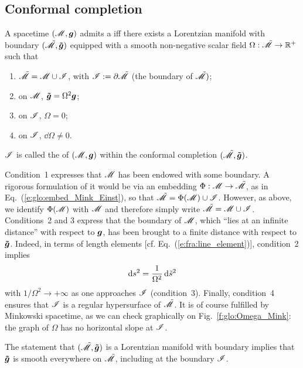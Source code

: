 \subsection{Conformal completion} \label{s:glo:def_conf_compl}

\begin{greybox}
A spacetime $(\mathscr{M},\bm{g})$ admits a
iff there exists a Lorentzian manifold with boundary
$(\tilde{\mathscr{M}},\bm{\tilde{g}})$ equipped with a smooth non-negative scalar field
$\Omega: \tilde{\mathscr{M}} \rightarrow \mathbb{R}^+$
such that
\begin{enumerate}
\item $\tilde{\mathscr{M}} = \mathscr{M} \cup \mathscr{I}$, with $\mathscr{I} := \partial \tilde{\mathscr{M}}$
(the boundary of $\tilde{\mathscr{M}})$;
\item on $\mathscr{M}$, $\bm{\tilde{g}} = \Omega^2 \bm{g}$;
\item on $\mathscr{I}$, $\Omega=0$;
\item on $\mathscr{I}$, $\dd \Omega \not= 0$.
\end{enumerate}
$\mathscr{I}$ is called the 
of $(\mathscr{M},\bm{g})$ within
the conformal completion $(\tilde{\mathscr{M}},\bm{\tilde{g}})$.
\end{greybox}
Condition~1 expresses that $\mathscr{M}$ has been endowed with some boundary.
A rigorous formulation of it would be via an embedding $\Phi:\mathscr{M} \rightarrow \tilde{\mathscr{M}}$,
as in Eq.~(\ref{e:glo:embed_Mink_Einst}), so that
$\tilde{\mathscr{M}} = \Phi(\mathscr{M}) \cup \mathscr{I}$. However, as above, we identify $\Phi(\mathscr{M})$
with $\mathscr{M}$ and therefore simply write $\tilde{\mathscr{M}} = \mathscr{M} \cup \mathscr{I}$.
Conditions~2 and 3 express that the boundary of $\mathscr{M}$, which ``lies at an infinite
distance'' with respect to $\bm{g}$, has been brought to a
finite distance with respect to $\bm{\tilde{g}}$. Indeed, in terms of
length elements [cf. Eq.~(\ref{e:fra:line_element})], condition~2 implies
\[
    \mathrm{d} s^2 = \frac{1}{\Omega^2} \, \mathrm{d} {\tilde s}^2
\]
with $1/\Omega^2 \rightarrow +\infty$ as one approaches $\mathscr{I}$
(condition~3).
Finally, condition~4 ensures
that $\mathscr{I}$ is a regular hypersurface of $\tilde{\mathscr{M}}$.
It is of course fulfilled by Minkowski spacetime, as we can check graphically
on Fig.~\ref{f:glo:Omega_Mink}: the graph of $\Omega$ has no horizontal slope
at $\mathscr{I}$.

\begin{remark}
The statement that $(\tilde{\mathscr{M}},\bm{\tilde{g}})$ is a Lorentzian manifold with
boundary implies that $\bm{\tilde{g}}$ is smooth everywhere on $\tilde{\mathscr{M}}$,
including at the boundary $\mathscr{I}$.
\end{remark}

